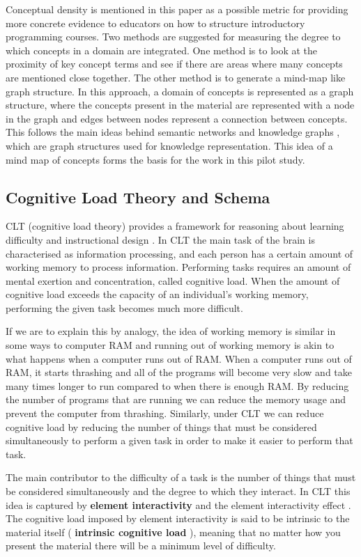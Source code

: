 \documentclass[12pt]{article}
\theoremstyle{grammarstyle}
\newcommand{\keyword}[1]{%
    \textbf{#1}%
}
\begin{document}
Conceptual density is mentioned in this paper as a possible metric for providing more concrete evidence to educators on how to structure introductory programming courses. Two methods are suggested for measuring the degree to which concepts in a domain are integrated. One method is to look at the proximity of key concept terms and see if there are areas where many concepts are mentioned close together. The other method is to generate a mind-map like graph structure. In this approach, a domain of concepts is represented as a graph structure, where the concepts present in the material are represented with a node in the graph and edges between nodes represent a connection between concepts. This follows the main ideas behind semantic networks and knowledge graphs \citep{sowa1987semantic, zhang2002knowledge, koncel2019text}, which are graph structures used for knowledge representation. This idea of a mind map of concepts forms the basis for the work in this pilot study.

\subsection{Cognitive Load Theory and Schema}
CLT (cognitive load theory) provides a framework for reasoning about learning difficulty and instructional design \citep{sweller1994cognitive}. In CLT the main task of the brain is characterised as information processing, and each person has a certain amount of working memory to process information. Performing tasks requires an amount of mental exertion and concentration, called cognitive load. When the amount of cognitive load exceeds the capacity of an individual's working memory, performing the given task becomes much more difficult.

If we are to explain this by analogy, the idea of working memory is similar in some ways to computer RAM and running out of working memory is akin to what happens when a computer runs out of RAM. When a computer runs out of RAM, it starts thrashing and all of the programs will become very slow and take many times longer to run compared to when there is enough RAM. By reducing the number of programs that are running we can reduce the memory usage and prevent the computer from thrashing. Similarly, under CLT we can reduce cognitive load by reducing the number of things that must be considered simultaneously to perform a given task in order to make it easier to perform that task.

The main contributor to the difficulty of a task is the number of things that must be considered simultaneously and the degree to which they interact. In CLT this idea is captured by \keyword{element interactivity} and the element interactivity effect \citep{sweller2011element}. The cognitive load imposed by element interactivity is said to be intrinsic to the material itself (\keyword{intrinsic cognitive load}), meaning that no matter how you present the material there will be a minimum level of difficulty.
\end{document}
